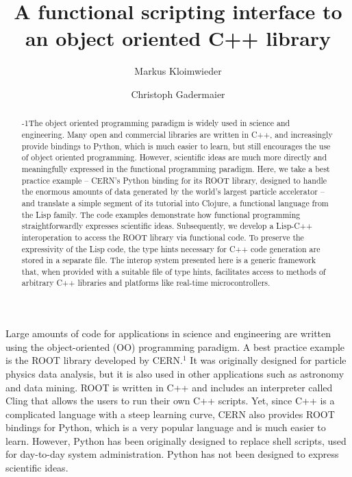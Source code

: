 \documentclass{IEEEcsmag}
\begin{document}

\title{A functional scripting interface to an object oriented C++ library}

\author{Markus Kloimwieder}

\author{Christoph Gadermaier}


\begin{abstract}\looseness-1The object oriented programming paradigm is widely used in science and engineering. Many open and commercial libraries are written in C++, and increasingly provide bindings to Python, which is much easier to learn, but still encourages the use of object oriented programming. However, scientific ideas are much more directly and meaningfully expressed in the functional programming paradigm. Here, we take a best practice example – CERN’s Python binding for its ROOT library, designed to handle the enormous amounts of data generated by the world’s largest particle accelerator – and translate a simple segment of its tutorial into Clojure, a functional language from the Lisp family. The code examples demonstrate how functional programming straightforwardly expresses scientific ideas. Subsequently, we develop a Lisp-C++ interoperation to access the ROOT library via functional code. To preserve the expressivity of the Lisp code, the type hints necessary for C++ code generation are stored in a separate file. The interop system presented here is a generic framework that, when provided with a suitable file of type hints, facilitates access to methods of arbitrary C++ libraries and platforms like real-time microcontrollers.
\end{abstract}

\maketitle
\chapteri
{L}arge amounts of code for applications in science and engineering are written using the object-oriented (OO) programming paradigm. A best practice example is the ROOT library developed by CERN.$^{1}$ It was originally designed for particle physics data analysis, but it is also used in other applications such as astronomy and data mining. ROOT is written in C++ and includes an interpreter called Cling that allows the users to run their own C++ scripts. Yet, since C++ is a complicated language with a steep learning curve, CERN also provides ROOT bindings for Python, which is a very popular language and is much easier to learn. However, Python has been originally designed to replace shell scripts, used for day-to-day system administration. Python has not been designed to express scientific ideas.
\end{document}
